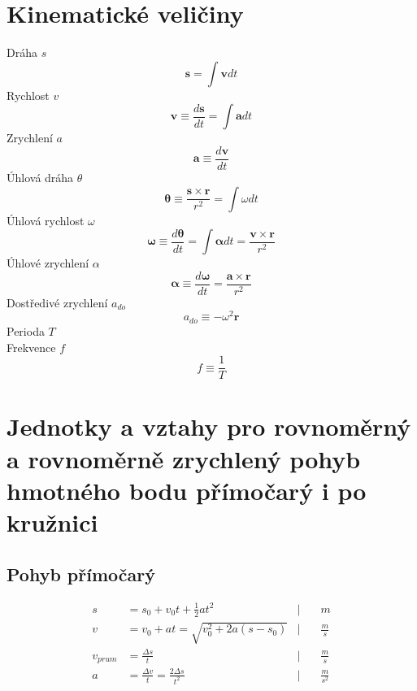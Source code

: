 \documentclass[titlepage]{book}
\begin{document}
\section{Kinematické veličiny}
Dráha $s$\\
\begin{equation}
\boldsymbol s = \int \boldsymbol v dt
\end{equation}
Rychlost $v$\\
\begin{equation}
\boldsymbol v \equiv \frac{d\boldsymbol s}{dt} = \int \boldsymbol a dt
\end{equation}
Zrychlení $a$\\
\begin{equation}
\boldsymbol a \equiv \frac{d\boldsymbol v}{dt}
\end{equation}
Úhlová dráha $\theta$\\
\begin{equation}
\boldsymbol \theta \equiv \frac{\boldsymbol s \times \boldsymbol r}{r^2} = \int \omega dt
\end{equation}
Úhlová rychlost $\omega$\\
\begin{equation}
\boldsymbol \omega \equiv \frac{d\boldsymbol \theta}{dt} = \int \boldsymbol \alpha dt = \frac{\boldsymbol v \times \boldsymbol r}{r^2}
\end{equation}
Úhlové zrychlení $\alpha$\\
\begin{equation}
\boldsymbol \alpha \equiv \frac{d\boldsymbol \omega}{dt} = \frac{\boldsymbol a \times \boldsymbol r}{r^2}
\end{equation}
Dostředivé zrychlení $a_{do}$\\
\begin{equation}
a_{do} \equiv -\omega^2 \boldsymbol r
\end{equation}
Perioda $T$\\
Frekvence $f$\\
\begin{equation}
f \equiv \frac{1}{T}
\end{equation}
\section{Jednotky a vztahy pro rovnoměrný a rovnoměrně zrychlený pohyb hmotného bodu přímočarý i po kružnici}
\subsection{Pohyb přímočarý}
\begin{align}
s &= s_0+v_0t+\frac{1}{2}at^2                            &  \Big| \quad &m\\
v &= v_0+at = \sqrt{v_0^2 + 2a(s-s_0)}                   &  \Big| \quad &\frac{m}{s}\\
v_{prum} &= \frac{\Delta s}{t}                           &  \Big| \quad &\frac{m}{s}\\
a &= \frac{\Delta v}{t} = \frac{2\Delta s}{t^2}          &  \Big| \quad &\frac{m}{s^2}
\end{align}
\end{document}
